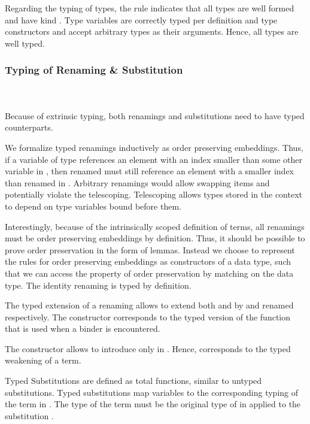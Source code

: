 \noindent Regarding the typing of types, the rule  indicates that all types  are well formed and have kind . Type variables are correctly typed per definition and type constructors  and  accept arbitrary types as their arguments. Hence, all types are well typed.

\subsubsection{Typing of Renaming \& Substitution}\hfill\\\\
Because of extrinsic typing, both renamings and substitutions need to have typed counterparts.

\noindent We formalize typed renamings  inductively as order preserving embeddings. 
Thus, if a variable  of type    references an element with an index smaller than some other variable  in , then renamed  must still reference an element with a smaller index than renamed  in .
Arbitrary renamings would allow swapping items and potentially violate the telescoping. 
Telescoping allows types stored in the context to depend on type variables bound before them. 

\noindent Interestingly, because of the intrinsically scoped definition of terms, all renamings must be order preserving embeddings by definition. Thus, it should be possible to prove order preservation in the form of lemmas. Instead we choose to represent the rules for order preserving embeddings as constructors of a data type, such that we can access the property of order preservation by matching on the data type.
\FRenTyping
The identity renaming  is typed by definition.

\noindent The typed extension of a renaming  allows to extend both  and  by  and renamed  respectively. The constructor  corresponds to the typed version of the function  that is used when a binder is encountered. 

\noindent The constructor  allows to introduce  only in . 
Hence,  corresponds to the typed weakening of a term.

\noindent Typed Substitutions are defined as total functions, similar to untyped substitutions.
\FSubTyping
Typed substitutions  map variables    to the corresponding typing of the term  in . The type of the term  must be the original type of  in  applied to the substitution .
